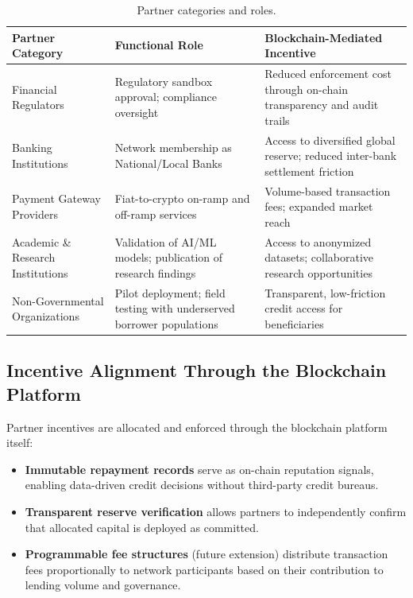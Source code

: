 \documentclass[12pt,a4paper]{report}
\newcommand{\tableheadfont}{\bfseries\small\color{PrimaryBlue}}
\newenvironment{moderntable}[1][H]{%
    \begin{table}[#1]\centering\small%
    \renewcommand{\arraystretch}{1.35}%
}{%
    \end{table}%
}
\begin{document}
\begin{moderntable}
\caption{Partner categories and roles.}
\begin{tabular}{@{} >{\raggedright}p{3.2cm} >{\raggedright}p{4.2cm} >{\raggedright\arraybackslash}p{4.6cm} @{}}
\toprule
\tableheadfont Partner Category & \tableheadfont Functional Role & \tableheadfont Blockchain-Mediated Incentive \\
\midrule
\rowcolor{RowShade}
Financial Regulators & Regulatory sandbox approval; compliance oversight & Reduced enforcement cost through on-chain transparency and audit trails \\
Banking Institutions & Network membership as National/Local Banks & Access to diversified global reserve; reduced inter-bank settlement friction \\
\rowcolor{RowShade}
Payment Gateway Providers & Fiat-to-crypto on-ramp and off-ramp services & Volume-based transaction fees; expanded market reach \\
Academic \& Research Institutions & Validation of AI/ML models; publication of research findings & Access to anonymized datasets; collaborative research opportunities \\
\rowcolor{RowShade}
Non-Governmental Organizations & Pilot deployment; field testing with underserved borrower populations & Transparent, low-friction credit access for beneficiaries \\
\bottomrule
\end{tabular}
\end{moderntable}

\subsection{Incentive Alignment Through the Blockchain Platform}

Partner incentives are allocated and enforced through the blockchain platform itself:

\begin{itemize}[noitemsep]
\item \textbf{Immutable repayment records} serve as on-chain reputation signals, enabling data-driven credit decisions without third-party credit bureaus.
\item \textbf{Transparent reserve verification} allows partners to independently confirm that allocated capital is deployed as committed.
\item \textbf{Programmable fee structures} (future extension) distribute transaction fees proportionally to network participants based on their contribution to lending volume and governance.
\end{itemize}
\end{document}

